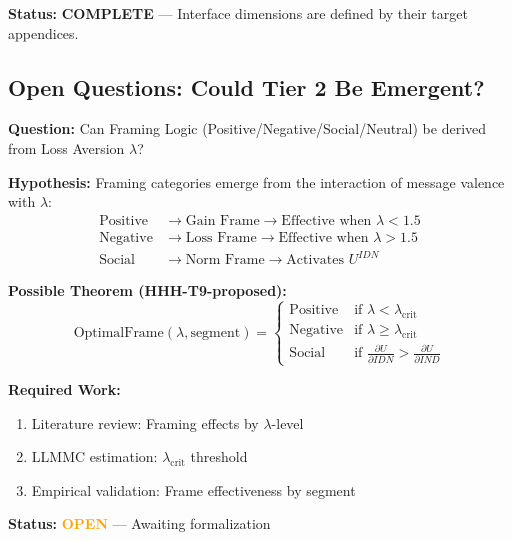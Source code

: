 \textbf{Status:} \textcolor{green!60!black}{\textbf{COMPLETE}} --- Interface dimensions are defined by their target appendices.

\subsection{Open Questions: Could Tier 2 Be Emergent?}

\begin{tcolorbox}[colback=yellow!5!white, colframe=yellow!75!black,
    title=\textbf{Research Question RQ-1: Framing Emergence (F7)}]

\textbf{Question:} Can Framing Logic (Positive/Negative/Social/Neutral) be derived from Loss Aversion $\lambda$?

\textbf{Hypothesis:} Framing categories emerge from the interaction of message valence with $\lambda$:
\begin{align}
\text{Positive} &\rightarrow \text{Gain Frame} \rightarrow \text{Effective when } \lambda < 1.5 \\
\text{Negative} &\rightarrow \text{Loss Frame} \rightarrow \text{Effective when } \lambda > 1.5 \\
\text{Social} &\rightarrow \text{Norm Frame} \rightarrow \text{Activates } U^{IDN}
\end{align}

\textbf{Possible Theorem (HHH-T9-proposed):}
\begin{equation}
\text{OptimalFrame}(\lambda, \text{segment}) = \begin{cases}
\text{Positive} & \text{if } \lambda < \lambda_{\text{crit}} \\
\text{Negative} & \text{if } \lambda \geq \lambda_{\text{crit}} \\
\text{Social} & \text{if } \frac{\partial U}{\partial IDN} > \frac{\partial U}{\partial IND}
\end{cases}
\end{equation}

\textbf{Required Work:}
\begin{enumerate}[nosep]
    \item Literature review: Framing effects by $\lambda$-level
    \item LLMMC estimation: $\lambda_{\text{crit}}$ threshold
    \item Empirical validation: Frame effectiveness by segment
\end{enumerate}

\textbf{Status:} \textcolor{orange}{\textbf{OPEN}} --- Awaiting formalization
\end{tcolorbox}

